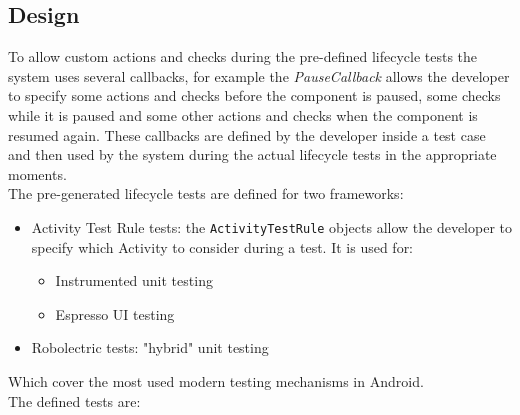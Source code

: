 \documentclass[11pt,a4paper,notitlepage]{article}
\begin{document}
\subsection{Design}
To allow custom actions and checks during the pre-defined lifecycle tests the system uses several callbacks, for example the \textit{PauseCallback} allows the developer to specify some actions and checks before the component is paused, some checks while it is paused and some other actions and checks when the component is resumed again. These callbacks are defined by the developer inside a test case and then used by the system during the actual lifecycle tests in the appropriate moments.\medskip \\
The pre-generated lifecycle tests are defined for two frameworks:
\begin{itemize}
	\item Activity Test Rule tests: the \texttt{ActivityTestRule} objects allow the developer to specify which Activity to consider during a test. It is used for:
	\begin{itemize}
		\item Instrumented unit testing
		\item Espresso UI testing
	\end{itemize}
	\item Robolectric tests: "hybrid" unit testing
\end{itemize}
Which cover the most used modern testing mechanisms in Android.\bigskip \\
The defined tests are:
\end{document}
